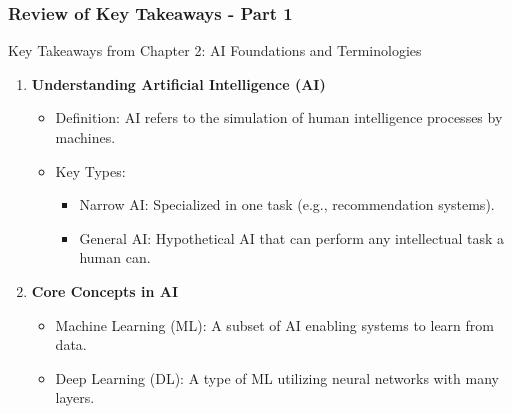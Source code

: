 \documentclass[aspectratio=169]{beamer}
\begin{document}
\begin{frame}[fragile]
    \frametitle{Review of Key Takeaways - Part 1}
    \begin{block}{Key Takeaways from Chapter 2: AI Foundations and Terminologies}
        \begin{enumerate}
            \item \textbf{Understanding Artificial Intelligence (AI)}
            \begin{itemize}
                \item Definition: AI refers to the simulation of human intelligence processes by machines.
                \item Key Types:
                    \begin{itemize}
                        \item Narrow AI: Specialized in one task (e.g., recommendation systems).
                        \item General AI: Hypothetical AI that can perform any intellectual task a human can.
                    \end{itemize}
            \end{itemize}
            \item \textbf{Core Concepts in AI}
            \begin{itemize}
                \item Machine Learning (ML): A subset of AI enabling systems to learn from data.
                \item Deep Learning (DL): A type of ML utilizing neural networks with many layers.
            \end{itemize}
        \end{enumerate}
    \end{block}
\end{frame}
\end{document}
